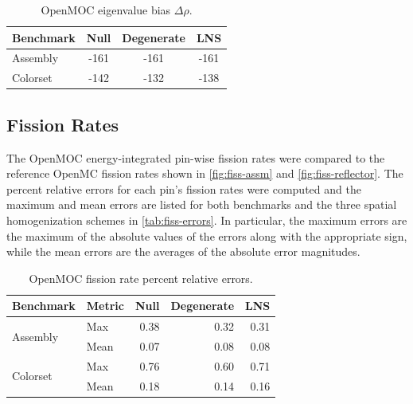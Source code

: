 \begin{table}[h!]
  \centering
  \caption{OpenMOC eigenvalue bias $\Delta\rho$.}
  \label{tab:keff-bias}
  \begin{tabular}{l c c c}
  \toprule
  \textbf{Benchmark} & \textbf{Null} & \textbf{Degenerate} & \textbf{LNS} \\
  \midrule
  Assembly & -161 & -161 & -161 \\
  Colorset & -142 & -132 & -138 \\
  \bottomrule
\end{tabular}
\end{table}


\subsection{Fission Rates}
\label{subsec:fiss-rates}

The OpenMOC energy-integrated pin-wise fission rates were compared to the reference OpenMC fission rates shown in \autoref{fig:fiss-assm} and \autoref{fig:fiss-reflector}. The percent relative errors for each pin's fission rates were computed and the maximum and mean errors are listed for both benchmarks and the three spatial homogenization schemes in \autoref{tab:fiss-errors}. In particular, the maximum errors are the maximum of the absolute values of the errors along with the appropriate sign, while the mean errors are the averages of the absolute error magnitudes.

\begin{table}[h!]
  \centering
  \caption{OpenMOC fission rate percent relative errors.}
  \label{tab:fiss-errors}
  \begin{tabular}{l l r r r}
  \toprule
  \textbf{Benchmark} & \textbf{Metric} & \textbf{Null} & \textbf{Degenerate} & \textbf{LNS} \\
  \midrule
  \multirow{2}{*}{Assembly} & Max  & 0.38 & 0.32 & 0.31 \\
                            & Mean & 0.07 & 0.08 & 0.08 \\
  \midrule
  \multirow{2}{*}{Colorset} & Max  & 0.76 & 0.60 & 0.71 \\
                            & Mean & 0.18 & 0.14 & 0.16 \\
  \bottomrule
\end{tabular}
\end{table}

